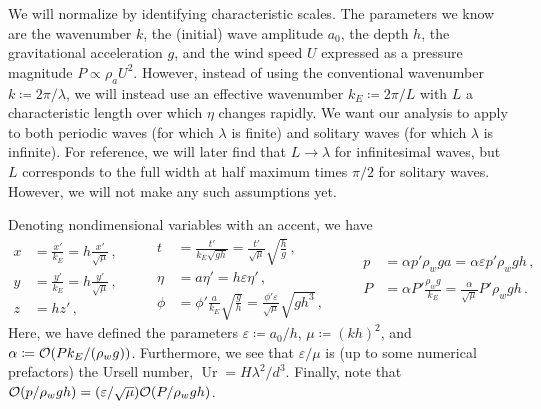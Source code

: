 \documentclass{jfm}
\DeclareMathOperator{\Ur}{Ur}
\renewcommand*{\epsilon}{\varepsilon}
\begin{document}
We will normalize by identifying characteristic scales.
The parameters we know \apriori are the wavenumber $k$, the (initial)
wave amplitude $a_0$, the depth $h$, the gravitational acceleration $g$,
and the wind speed $U$ expressed as a pressure magnitude $P \propto
\rho_a U^2$.
However, instead of using the conventional wavenumber $k \coloneqq 2 \pi
/ \lambda$, we will instead use an effective wavenumber $k_E \coloneqq 2
\pi/ L$ with $L$ a characteristic length over which $\eta$ changes
rapidly.
We want our analysis to apply to both periodic waves (for which
$\lambda$ is finite) and solitary waves (for which $\lambda$ is
infinite).
For reference, we will later find that $L \to \lambda$ for infinitesimal
waves, but $L$ corresponds to the full width at half maximum times $\pi/2$ for solitary
waves.
However, we will not make any such assumptions yet.

Denoting nondimensional variables with an accent, we have
\begin{equation*}
  \begin{aligned}
  x &= \frac{x'}{k_E} = h \frac{x'}{\sqrt{\mu}}\,, \\
  y &= \frac{y'}{k_E} = h \frac{y'}{\sqrt{\mu}}\,, \\
  z &= h z' \,,
  \end{aligned}
  \qquad
  \begin{aligned}
  t &= \frac{t'}{k_E\sqrt{g h}}
    = \frac{t'}{\sqrt{\mu}} \sqrt{\frac{h}{g}} \,, \\
  \eta &= a \eta' = h \epsilon \eta' \,, \\
  \phi &= \phi'\frac{a}{k_E}\sqrt{\frac{g}{h}}
    = \frac{\phi'\epsilon}{\sqrt{\mu}}\sqrt{g h^3} \,,
  \end{aligned}
  \qquad
  \begin{aligned}
  p &= \alpha p' \rho_w g a
    = \alpha \epsilon p' \rho_w g h \,, \\
  P &= \alpha P' \frac{\rho_w g}{k_E}
    = \frac{\alpha}{\sqrt{\mu}} P' \rho_w g h \,.
  \end{aligned}
\end{equation*}
Here, we have defined the parameters $\epsilon \coloneqq a_0/h$, $\mu
\coloneqq (kh)^2$, and $\alpha \coloneqq \order{P k_E/(\rho_w g
)}$.
Furthermore, we see that $\epsilon/\mu$ is (up to some numerical
prefactors) the Ursell number, $\Ur = H \lambda^2/d^3$.
Finally, note that $\order{p/\rho_w g h} = (\epsilon/\sqrt{\mu})
\order{P/\rho_w g h}$.
\end{document}
